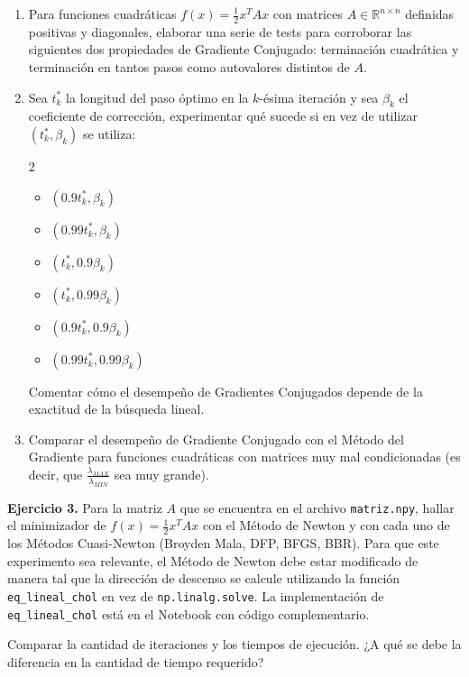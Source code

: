 \documentclass{article}
\begin{document}
\begin{enumerate}
    \item Para funciones cuadráticas $f(x) = \frac{1}{2}x^T A x$ con matrices $A\in\mathbb{R}^{n\times n}$ definidas positivas y diagonales, elaborar una serie de tests para corroborar las siguientes dos propiedades de Gradiente Conjugado: terminación cuadrática y terminación en tantos pasos como autovalores distintos de $A$.
    \item Sea $t_k^\ast$ la longitud del paso óptimo en la $k$-ésima iteración y sea $\beta_k$ el coeficiente de corrección, experimentar qué sucede si en vez de utilizar $(t_k^\ast, \beta_k)$ se utiliza:
    \begin{multicols}{2}
        \begin{itemize}
            \item $(0.9t_k^\ast, \beta_k)$
            \item $(0.99t_k^\ast, \beta_k)$
            \item $(t_k^\ast, 0.9\beta_k)$
            \item $(t_k^\ast, 0.99\beta_k)$
            \item $(0.9t_k^\ast, 0.9\beta_k)$
            \item $(0.99t_k^\ast, 0.99\beta_k)$
        \end{itemize}
    \end{multicols}
    Comentar cómo el desempeño de Gradientes Conjugados depende de la exactitud de la búsqueda lineal.
    \item Comparar el desempeño de Gradiente Conjugado con el Método del Gradiente para funciones cuadráticas con matrices muy mal condicionadas (es decir, que $\frac{\lambda_{MAX}}{\lambda_{MIN}}$ sea muy grande). 
\end{enumerate}

\textbf{Ejercicio 3.}
Para la matriz $A$ que se encuentra en el archivo \texttt{matriz.npy}, hallar el minimizador de ${f(x) = \frac{1}{2}x^T A x}$ con el Método de Newton y con cada uno de los Métodos Cuasi-Newton (Broyden Mala, DFP, BFGS, BBR). Para que este experimento sea relevante, el Método de Newton debe estar modificado de manera tal que la dirección de descenso se calcule utilizando la función \texttt{eq\_lineal\_chol} en vez de \texttt{np.linalg.solve}. La implementación de \texttt{eq\_lineal\_chol} está en el Notebook con código complementario.

Comparar la cantidad de iteraciones y los tiempos de ejecución. ¿A qué se debe la diferencia en la cantidad de tiempo requerido?
\vspace*{\baselineskip}
\end{document}

